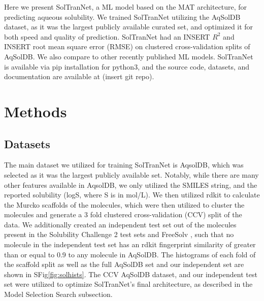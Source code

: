 \documentclass[journal=jmcmar,manuscript=article]{achemso}
\begin{document}
Here we present SolTranNet, a ML model based on the MAT architecture, for predicting aqueous solubility.
We trained SolTranNet utilizing the AqSolDB dataset\cite{AqSol}, as it was the largest publicly available curated set, and optimized it for both speed and quality of prediction.
SolTranNet had an INSERT $R^2$ and INSERT root mean square error (RMSE) on clustered cross-validation splits of AqSolDB.
We also compare to other recently published ML models.\cite{lovric,cui,boobier,llinas}
SolTranNet is available via pip installation for python3, and the source code, datasets, and documentation are available at (insert git repo).


\section{Methods}

\subsection{Datasets}
The main dataset we utilized for training SolTranNet is AqsolDB\cite{AqSol}, which was selected as it was the largest publicly available set.
Notably, while there are many other features available in AqsolDB, we only utilized the SMILES string, and the reported solubility (logS, where S is in mol/L).
We then utilized rdkit\cite{rdkit} to calculate the Murcko scaffolds of the molecules, which were then utilized to cluster the molecules and generate a 3 fold clustered cross-validation (CCV) split of the data.
We additionally created an independent test set out of the molecules present in the Solubility Challenge 2 test sets \cite{llinas} and FreeSolv \cite{freesolv}, such that no molecule in the independent test set has an rdkit fingerprint similarity of greater than or equal to 0.9 to any molecule in AqSolDB.
The histograms of each fold of the scaffold split as well as the full AqSolDB set and our independent set are shown in SFig\ref{fig:solhists}.
The CCV AqSolDB dataset, and our independent test set were utilized to optimize SolTranNet's final architecture, as described in the Model Selection Search subsection.
\end{document}
